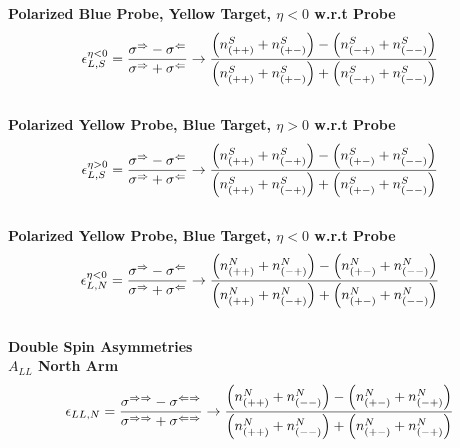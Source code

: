 \noindent\textbf{Polarized Blue Probe, Yellow Target, $\eta < 0$ w.r.t Probe}
\begin{equation}
  {\epsilon_{L,S}^{\eta < 0}} 
  = 
  { 
    {\sigma^\Rightarrow - \sigma^\Leftarrow} 
    \over 
    {\sigma^\Rightarrow + \sigma^\Leftarrow} 
  } 
  \to 
  {
    {\left(n_{(++)}^S+n_{(+-)}^S\right)-\left(n_{(-+)}^S+n_{(--)}^S\right)}
    \over
    {\left(n_{(++)}^S+n_{(+-)}^S\right)+\left(n_{(-+)}^S+n_{(--)}^S\right)}
  }
  \label{eq:al_blue_probe_neg_rap}
\end{equation}\\

\noindent\textbf{Polarized Yellow Probe, Blue Target, $\eta > 0$ w.r.t Probe}
\begin{equation}
  {\epsilon_{L,S}^{\eta > 0}} 
  = 
  { 
    {\sigma^\Rightarrow-\sigma^\Leftarrow} 
    \over 
    {\sigma^\Rightarrow+\sigma^\Leftarrow} 
  } 
  \to 
  {
    {\left(n_{(++)}^S+n_{(-+)}^S\right)-\left(n_{(+-)}^S+n_{(--)}^S\right)}
    \over
    {\left(n_{(++)}^S+n_{(-+)}^S\right)+\left(n_{(+-)}^S+n_{(--)}^S\right)}
  }
  \label{eq:al_yell_probe_pos_rap}
\end{equation}\\

\noindent\textbf{Polarized Yellow Probe, Blue Target, $\eta < 0$ w.r.t Probe}
\begin{equation}
  {\epsilon_{L,N}^{\eta < 0}} 
  = 
  { 
    {\sigma^\Rightarrow-\sigma^\Leftarrow} 
    \over 
    {\sigma^\Rightarrow+\sigma^\Leftarrow} 
  } 
  \to 
  {
    {\left(n_{(++)}^N+n_{(-+)}^N\right)-\left(n_{(+-)}^N+n_{(--)}^N\right)}
    \over
    {\left(n_{(++)}^N+n_{(-+)}^N\right)+\left(n_{(+-)}^N+n_{(--)}^N\right)}
  }
  \label{eq:al_yell_probe_neg_rap}
\end{equation}\\

\noindent\textbf{Double Spin Asymmetries} \\

\noindent\textbf{$A_{LL}$ North Arm}
\begin{equation}
  {\epsilon_{LL,N}}
  = 
  { 
    {\sigma^{\Rightarrow\Rightarrow}-\sigma^{\Leftarrow\Rightarrow}} 
    \over 
    {\sigma^{\Rightarrow\Rightarrow}+\sigma^{\Leftarrow\Rightarrow}} 
  } 
  \to 
  {
    {\left(n_{(++)}^N+n_{(--)}^N\right)-\left(n_{(+-)}^N+n_{(-+)}^N\right)}
    \over
    {\left(n_{(++)}^N+n_{(--)}^N\right)+\left(n_{(+-)}^N+n_{(-+)}^N\right)}
  }
  \label{eq:all_north}
\end{equation}\\

